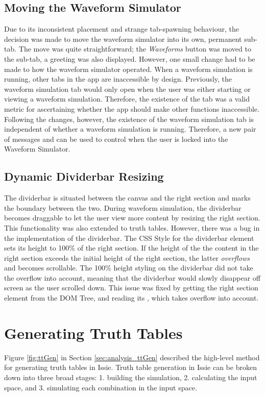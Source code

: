 \subsection{Moving the Waveform Simulator}
Due to its inconsistent placement and strange tab-spawning behaviour, the decision was made to move the waveform simulator into its own, permanent sub-tab. The move was quite straightforward; the \textit{Waveforms} button was moved to the sub-tab, a greeting was also displayed. However, one small change had to be made to how the waveform simulator operated. When a waveform simulation is running, other tabs in the app are inaccessible by design. Previously, the waveform simulation tab would only open when the user was either starting or viewing a waveform simulation. Therefore, the existence of the tab was a valid metric for ascertaining whether the app should make other functions inaccessible. Following the changes, however, the existence of the waveform simulation tab is independent of whether a waveform simulation is running. Therefore, a new pair of messages  and  can be used to control when the user is locked into the Waveform Simulator.

\subsection{Dynamic Dividerbar Resizing}
The dividerbar is situated between the canvas and the right section and marks the boundary between the two. During waveform simulation, the dividerbar becomes draggable to let the user view more content by resizing the right section. This functionality was also extended to truth tables. However, there was a bug in the implementation of the dividerbar. The CSS Style for the dividerbar element sets its height to 100\% of the right section. If the height of the the content in the right section exceeds the initial height of the right section, the latter \textit{overflows} and becomes scrollable. The 100\% height styling on the dividerbar did not take the overflow into account, meaning that the dividerbar would slowly disappear off screen as the user scrolled down. This issue was fixed by getting the right section  element from the DOM Tree, and reading its , which takes overflow into account. 

\section{Generating Truth Tables}
Figure \ref{fig:ttGen} in Section \ref{sec:analysis_ttGen} described the high-level method for generating truth tables in Issie. Truth table generation in Issie can be broken down into three broad stages: 1. building the simulation, 2. calculating the input space, and 3. simulating each combination in the input space. 

